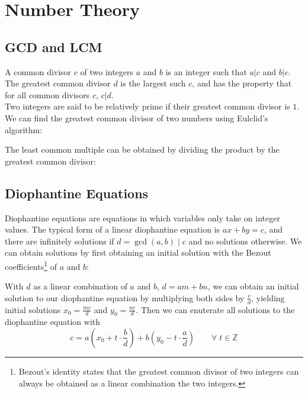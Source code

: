 \documentclass{article}
\newcommand{\setZ}{\mathbb{Z}}
\begin{document}
\tableofcontents

\lstlistoflistings
\newpage

\section{Number Theory}
\subsection{GCD and LCM}
A common divisor $c$ of two integers $a$ and $b$ is an integer such that $a | c$ and $b | c$. The greatest common divisor $d$ is the largest such $c$, and has the property that for all common divisors $c$, $c | d$. \\
Two integers are said to be relatively prime if their greatest common divisor is $1$. \\
We can find the greatest common divisor of two numbers using Eulclid's algorithm:

The least common multiple can be obtained by dividing the product by the greatest common divisor:


\subsection{Diophantine Equations}
Diophantine equations are equations in which variables only take on integer values. The typical form of a linear diophantine equation is $ax + by = c$, and there are infinitely solutions if $d = \gcd(a, b) \mid c$ and no solutions otherwise. We can obtain solutions by first obtaining an initial solution with the Bezout coefficients\footnote{Bezout's identity states that the greatest common divisor of two integers can always be obtained as a linear combination the two integers.} of $a$ and $b$:

With $d$ as a linear combination of $a$ and $b$, $d = am + bn$, we can obtain an initial solution to our diophantine equation by multiplying both sides by $\frac{c}{d}$, yielding initial solutions $x_0 = \frac{mc}{d}$ and $y_0 = \frac{nc}{d}$. Then we can enuterate all solutions to the diophantine equation with
\[ c = a \left(x_0 + t \cdot \frac{b}{d} \right) + b \left(y_0 - t \cdot \frac{a}{d} \right) \qquad \forall \; t \in \setZ \]

\end{document}
